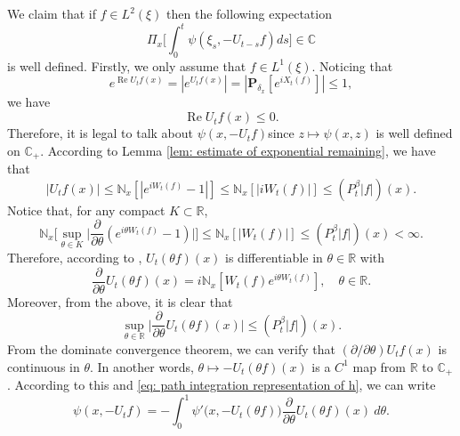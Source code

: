 \documentclass[12pt]{amsart}
\theoremstyle{plain}
\theoremstyle{definition}
\numberwithin{equation}{section}
\begin{document}
    We claim that if $f\in L^2(\xi)$ then the following expectation
\[
    \Pi_x\Big[\int_0^t \psi(\xi_s,- U_{t-s}f)ds\Big]
    \in \mathbb C
\]
    is well defined. Firstly, we only assume that $f\in L^1(\xi)$.
    Noticing that
\[
     e^{\operatorname{Re} U_tf(x)}
    = |e^{U_tf(x)}|
    = |\mathbf P_{\delta_x}[e^{i X_t(f)}]|
    \leq 1,
\]
    we have
\begin{equation}
\label{eq: -v has positive real part}
 \operatorname{Re} U_tf(x)
    \leq 0.
\end{equation}
    Therefore, it is legal to talk about $\psi(x,-U_tf)$since $z\mapsto \psi(x,z)$ is well defined on $\mathbb C_+$.
    According to Lemma \ref{lem: estimate of exponential remaining}, we have that
\begin{equation}
\label{eq: upper bound for vf}
    |U_tf(x)| \leq \mathbb N_x[|e^{i W_t(f)} - 1|]
    \leq \mathbb N_x[|i W_t(f)|]
    \leq (P^\beta_t |f|)(x).
\end{equation}
    Notice that, for any compact $K \subset \mathbb R$,
\begin{equation}
\label{eq: estimate of deriavetive of v(theta)}
    \mathbb N_x\Big[\sup_{\theta \in K} \Big|\frac{\partial}{\partial \theta} (e^{i\theta W_t(f)} - 1) \Big|\Big]
    \leq \mathbb N_x[|W_t(f)|] \leq (P^\beta_t |f|)(x) < \infty.
\end{equation}
    Therefore, according to \cite[Theorem A.5.2.]{Durrett2010Probability},
    $U_t(\theta f)(x)$ is differentiable in $\theta \in \mathbb R$ with
\[
    \frac{\partial}{\partial \theta} U_t(\theta f)(x)
    = i\mathbb N_x[W_t(f)e^{i\theta W_t(f)}],
    \quad \theta \in \mathbb R.
\]
    Moreover, from the above, it is clear that
\begin{equation}
\label{eq: upper bounded for derivative of v(theta)}
    \sup_{\theta \in \mathbb R}\Big| \frac{\partial}{\partial \theta}U_t(\theta f)(x)\Big|
    \leq ( P^\beta_t |f|)(x).
\end{equation}
    From the dominate convergence theorem, we can verify that $(\partial/\partial \theta)U_tf(x)$ is continuous in $\theta$.
    In another words, $\theta \mapsto -U_t(\theta f)(x)$ is a $C^1$ map from $\mathbb R$ to $\mathbb C_+$.
    According to this and \eqref{eq: path integration representation of h}, we can write
\begin{equation}
\label{eq: path integration representation of psi(v)}
    \psi(x,-U_tf) = -\int_0^1 \psi'\big(x,-U_t(\theta f)\big) \frac{\partial}{\partial \theta} U_t(\theta f)(x)~d\theta.
\end{equation}
\end{document}
